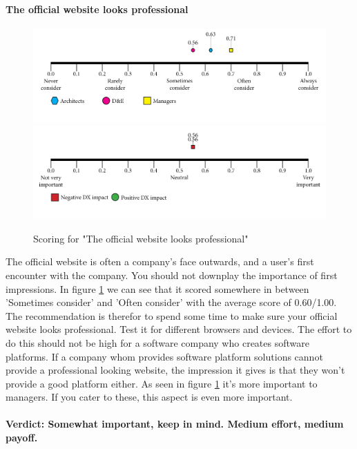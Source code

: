     \paragraph{The official website looks professional}
    \begin{figure}[H]
        \centering
        \includegraphics[width=\linewidth]{scorelines/aspect8.png}
        \includegraphics[width=\linewidth]{dxscorelines/dxaspect8.png}
        \caption{Scoring for "The official website looks professional"}
        \label{fig:aspect8}
    \end{figure}
    The official website is often a company's face outwards, and a user's first encounter with the company. You should not downplay the importance of first impressions. In figure \ref{fig:aspect8} we can see that it scored somewhere in between 'Sometimes consider' and 'Often consider' with the average score of 0.60/1.00. The recommendation is therefor to spend some time to make sure your official website looks professional. Test it for different browsers and devices. The effort to do this should not be high for a software company who creates software platforms. If a company whom provides software platform solutions cannot provide a professional looking website, the impression it gives is that they won't provide a good platform either. As seen in figure \ref{fig:aspect8} it's more important to managers. If you cater to these, this aspect is even more important. 
    \\ \\
    \textbf{Verdict: Somewhat important, keep in mind. Medium effort, medium payoff.}
    
